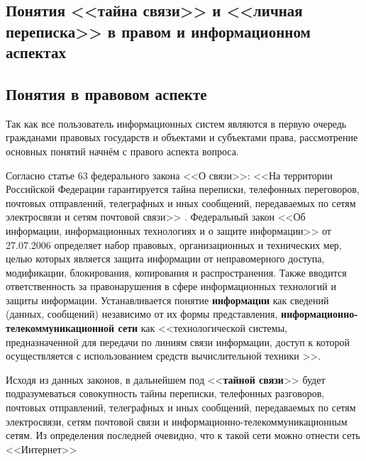 \parindent=1cm %
\begin{center}
		
		\section{Понятия <<тайна связи>> и <<личная переписка>> в правом и информационном аспектах}
		
\end{center}
\subsection{Понятия в правовом аспекте} 

Так как все пользователь информационных систем являются в первую очередь гражданами правовых государств и объектами и субъектами права, рассмотрение основных понятий начнём с правого аспекта вопроса.

Согласно статье 63 федерального закона <<О связи>>: %
<<На территории Российской Федерации гарантируется тайна переписки, телефонных переговоров, почтовых отправлений, телеграфных и иных сообщений, передаваемых по сетям электросвязи и сетям почтовой связи>> .
Федеральный закон <<Об информации, информационных технологиях и о защите информации>> от 27.07.2006 
определяет набор правовых, организационных и технических мер,  целью которых является  защита информации от неправомерного доступа, модификации, блокирования, копирования и распространения. Также вводится ответственность за правонарушения в сфере информационных технологий и защиты информации.  Устанавливается понятие \textbf{информации} как сведений (данных, сообщений) независимо от их формы представления, \textbf{информационно-телекоммуникационной сети } как <<технологической системы, предназначенной для передачи по линиям связи информации, доступ к которой осуществляется с использованием средств вычислительной техники >>. 

Исходя из данных законов, в дальнейшем под <<\textbf{тайной связи}>>  будет подразумеваться совокупность тайны переписки, телефонных разговоров, почтовых отправлений, телеграфных и иных сообщений, передаваемых по сетям электросвязи, сетям почтовой связи и информационно-телекоммуникационным сетям.  Из определения последней очевидно, что к такой сети  можно отнести сеть <<Интернет>>

